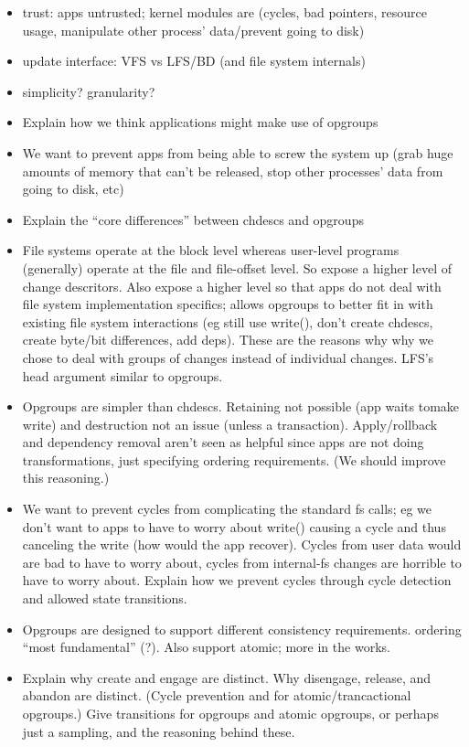 \begin{itemize}
\item trust: apps untrusted; kernel modules are (cycles, bad pointers, resource usage, manipulate other process' data/prevent going to disk)
\item update interface: VFS vs LFS/BD (and file system internals)
\item simplicity? granularity?
\end{itemize}

\begin{itemize}
\item Explain how we think applications might make use of opgroups
\item We want to prevent apps from being able to screw the system up
  (grab huge amounts of memory that can't be released, stop other
  processes' data from going to disk, etc)
\item Explain the ``core differences'' between chdescs and
  opgroups
\item File systems operate at the block level whereas user-level
  programs (generally) operate at the file and file-offset level.
  So expose a higher level of change descritors. Also expose a
  higher level so that apps do not deal with file system
  implementation specifics; allows opgroups to better fit in with
  existing file system interactions (eg still use write(), don't
  create chdescs, create byte/bit differences, add deps). These are
  the reasons why why we chose to deal with groups of changes
  instead of individual changes. LFS's head argument similar to
  opgroups.
\item Opgroups are simpler than chdescs. Retaining not possible (app
  waits tomake write) and destruction not an issue (unless a
  transaction). Apply/rollback and dependency removal aren't seen as
  helpful since apps are not doing transformations, just specifying
  ordering requirements. (We should improve this reasoning.)
\item We want to prevent cycles from complicating the standard fs
  calls; eg we don't want to apps to have to worry about write()
  causing a cycle and thus canceling the write (how would the app
  recover). Cycles from user data would are bad to have to worry
  about, cycles from internal-fs changes are horrible to have to
  worry about. Explain how we prevent cycles through cycle detection
  and allowed state transitions.

\item Opgroups are designed to support different consistency
  requirements. ordering ``most fundamental'' (?). Also support
  atomic; more in the works.
\item Explain why create and engage are distinct. Why disengage,
  release, and abandon are distinct. (Cycle prevention and for
  atomic/trancactional opgroups.) Give transitions for opgroups and
  atomic opgroups, or perhaps just a sampling, and the reasoning
  behind these.
\end{itemize}

